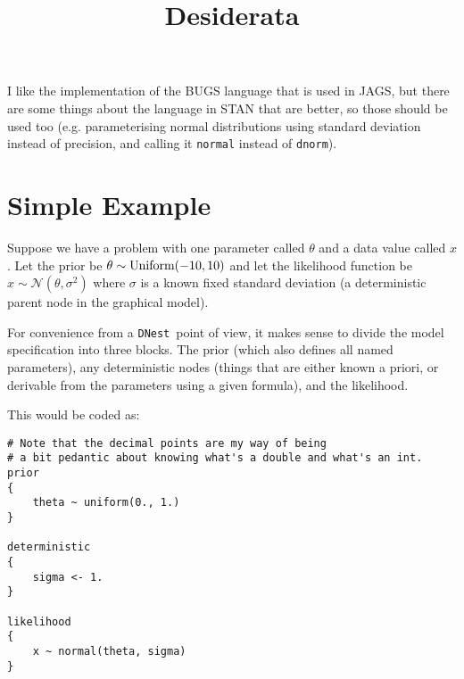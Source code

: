 \documentclass[letterpaper, 11pt]{article}
\title{Desiderata}
\newcommand{\dnest}{{\tt DNest}}
\begin{document}
\maketitle


I like the implementation of the BUGS language that is used in JAGS, but there
are some things about the language in STAN that are better, so those should
be used too (e.g. parameterising normal distributions using standard deviation
instead of precision, and calling it {\tt normal} instead of {\tt dnorm}).

\section{Simple Example}
Suppose we have a problem with one parameter called $\theta$ and a data value
called $x$. Let
the prior be $\theta \sim \textnormal{Uniform}(-10, 10)$ and let the likelihood
function
be $x \sim \mathcal{N}(\theta, \sigma^2)$ where $\sigma$ is a known fixed
standard deviation (a deterministic parent node in the graphical model).

For convenience from a \dnest~point of view, it makes sense to divide
the model specification into three blocks. The prior (which also defines all
named parameters), any deterministic nodes (things that are either known
a priori, or
derivable from the parameters using a given formula), and the likelihood.

This would be coded as:
\begin{verbatim}
# Note that the decimal points are my way of being
# a bit pedantic about knowing what's a double and what's an int.
prior
{
    theta ~ uniform(0., 1.)
}

deterministic
{
    sigma <- 1.
}

likelihood
{
    x ~ normal(theta, sigma)
}
\end{verbatim}
\end{document}
